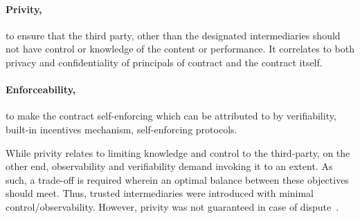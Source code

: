\paragraph{Privity,}to ensure that the third party, other than the designated
intermediaries should not have control or knowledge of the content or
performance. It correlates to both privacy and confidentiality of principals of
contract and the contract itself. 
\paragraph{Enforceability,}to make the contract self-enforcing which can be
attributed to by verifiability, built-in incentives mechanism, self-enforcing
protocols. \par
While privity relates to limiting knowledge and control to the third-party, on
the other end, observability and verifiability demand invoking it to an extent.
As such, a trade-off is required wherein an optimal balance between these
objectives should meet. Thus, trusted intermediaries were introduced with
minimal control/observability.  However, privity was not guaranteed in case of
dispute~\cite{szabo1997formalizing}. \par
